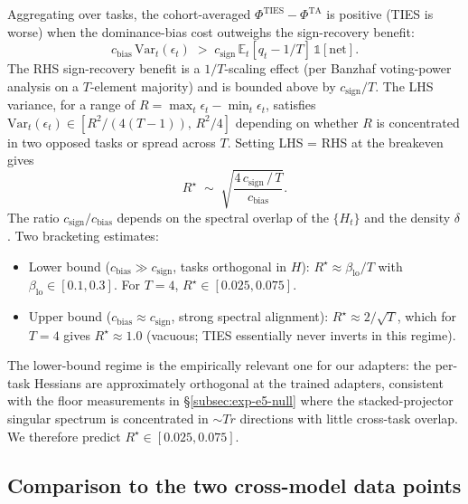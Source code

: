 Aggregating over tasks, the cohort-averaged $\Phi^{\mathrm{TIES}} -
\Phi^{\mathrm{TA}}$ is positive (TIES is worse) when the dominance-bias
cost outweighs the sign-recovery benefit:
\begin{equation}
  c_{\mathrm{bias}}\, \mathrm{Var}_t(\epsilon_t)
  \;>\;
  c_{\mathrm{sign}}\, \mathbb{E}_t[q_t - 1/T]\, \mathbb{1}[\text{net}].
  \label{eq:inversion-condition}
\end{equation}
The RHS sign-recovery benefit is a $1/T$-scaling effect (per Banzhaf
voting-power analysis on a $T$-element majority) and is bounded above
by $c_{\mathrm{sign}}/T$. The LHS variance, for a range of
$R = \max_t \epsilon_t - \min_t \epsilon_t$, satisfies
$\mathrm{Var}_t(\epsilon_t) \in [R^2/(4(T-1)),\, R^2/4]$ depending on
whether $R$ is concentrated in two opposed tasks or spread across $T$.
Setting LHS = RHS at the breakeven gives
\begin{equation}
  R^\star
  \;\sim\;
  \sqrt{\frac{4\, c_{\mathrm{sign}}\,/\,T}{c_{\mathrm{bias}}}}.
  \label{eq:threshold}
\end{equation}
The ratio $c_{\mathrm{sign}}/c_{\mathrm{bias}}$ depends on the spectral
overlap of the $\{H_t\}$ and the density $\delta$. Two bracketing
estimates:
\begin{itemize}
\item Lower bound ($c_{\mathrm{bias}} \gg c_{\mathrm{sign}}$,
  tasks orthogonal in $H$):
  $R^\star \approx \beta_{\mathrm{lo}} / T$ with $\beta_{\mathrm{lo}} \in
  [0.1, 0.3]$. For $T = 4$, $R^\star \in [0.025, 0.075]$.
\item Upper bound ($c_{\mathrm{bias}} \approx c_{\mathrm{sign}}$,
  strong spectral alignment): $R^\star \approx 2/\sqrt{T}$, which for
  $T = 4$ gives $R^\star \approx 1.0$ (vacuous; TIES essentially never
  inverts in this regime).
\end{itemize}
The lower-bound regime is the empirically relevant one for our
adapters: the per-task Hessians are approximately orthogonal at the
trained adapters, consistent with the floor measurements in
\S\ref{subsec:exp-e5-null} where the stacked-projector singular
spectrum is concentrated in $\sim T r$ directions with little
cross-task overlap. We therefore predict
$R^\star \in [0.025, 0.075]$.

\subsection{Comparison to the two cross-model data points}
\label{app:td2-comparison}

